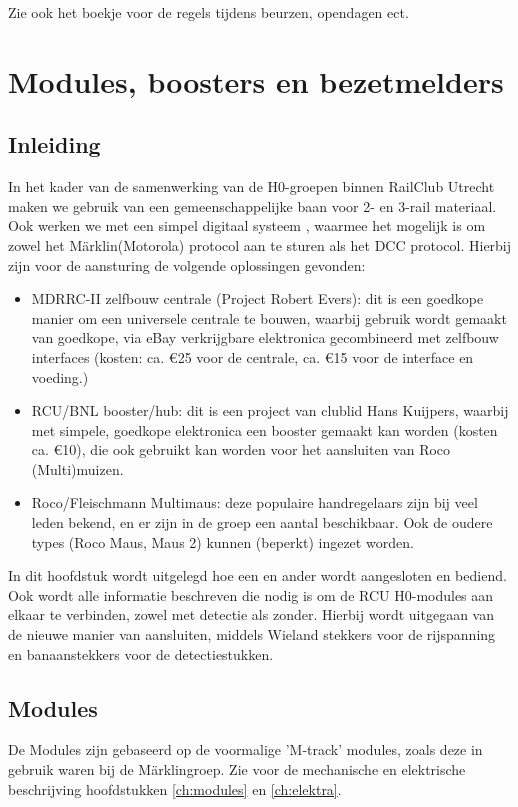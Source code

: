 \documentclass[12pt,a4paper]{report}
\newcommand*{\marklin}{M\"{a}rklin}
\begin{document}
Zie ook het boekje voor de regels tijdens beurzen, opendagen ect.

\chapter{Modules, boosters en bezetmelders}
\label{ch:electronica}
\section{Inleiding}

In het kader van de samenwerking van de H0-groepen binnen RailClub Utrecht maken we gebruik van een gemeenschappelijke baan voor 2- en 3-rail materiaal. Ook werken we met een simpel digitaal systeem , waarmee het mogelijk is om zowel het \marklin (Motorola) protocol aan te sturen als het DCC protocol.
Hierbij zijn voor de aansturing de volgende oplossingen gevonden:
\begin{itemize}
\item MDRRC-II zelfbouw centrale (Project Robert Evers): dit is een goedkope manier om een universele centrale te bouwen, waarbij gebruik wordt gemaakt van goedkope, via eBay verkrijgbare elektronica gecombineerd met zelfbouw interfaces (kosten: ca. \euro 25 voor de centrale, ca. \euro 15 voor de interface en voeding.)
\item RCU/BNL booster/hub: dit is een project van clublid Hans Kuijpers, waarbij met simpele, goedkope elektronica een booster gemaakt kan worden (kosten ca. \euro 10), die ook gebruikt kan worden voor het aansluiten van Roco (Multi)muizen.
\item Roco/Fleischmann Multimaus: deze populaire handregelaars zijn bij veel leden bekend, en er zijn in de groep een aantal beschikbaar. Ook de oudere types (Roco Maus, Maus 2) kunnen (beperkt) ingezet worden.
\end{itemize}

In dit hoofdstuk wordt uitgelegd hoe een en ander wordt aangesloten en bediend. Ook wordt alle informatie beschreven die nodig is om de RCU H0-modules aan elkaar te verbinden, zowel met detectie als zonder. Hierbij wordt uitgegaan van de nieuwe manier van aansluiten, middels Wieland stekkers voor de rijspanning en banaanstekkers voor de detectiestukken.

\section{Modules}
De Modules zijn gebaseerd op de voormalige 'M-track' modules, zoals deze in gebruik waren bij de \marklin groep. Zie voor de mechanische  en elektrische beschrijving hoofdstukken \ref{ch:modules} en \ref{ch:elektra}.
\end{document}
